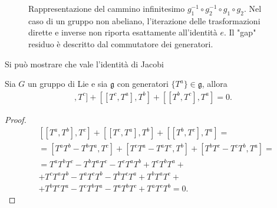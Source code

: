 \begin{figure}
    \centering
    \usetikzlibrary{positioning, calc}
    \caption{Rappresentazione del cammino infinitesimo $g_1^{-1} \circ g_2^{-1} \circ g_1 \circ g_2$. Nel caso di un gruppo non abeliano, l'iterazione delle trasformazioni dirette e inverse non riporta esattamente all'identità $e$. Il "gap" residuo è descritto dal commutatore dei generatori.}
\end{figure}

Si può mostrare che vale l'identità di Jacobi
\begin{prop}
    Sia $G$ un gruppo di Lie e sia $\mathfrak{g}$ con generatori $\{ T^a \} \in \mathfrak{g}$, allora
    \begin{align}
        [[T^a, T^b], T^c] + [[T^c, T^a], T^b] + [[T^b, T^c], T^a] = 0.
    \end{align}
\end{prop}
\begin{proof}
    \begin{align}
        &[[T^a, T^b], T^c] + [[T^c, T^a], T^b] + [[T^b, T^c], T^a] = \\
        &=[T^a T^b - T^b T^a, T^c] + [T^c T^a - T^a T^c, T^b] + [T^b T^c - T^c T^b, T^a] = \\
        &= T^a T^b T^c - T^b T^a T^c - T^c T^a T^b + T^c T^b T^a + \\
        &+ T^c T^a T^b - T^a T^c T^b - T^b T^c T^a + T^b T^a T^c + \\
        &+ T^b T^c T^a - T^c T^b T^a - T^a T^b T^c + T^a T^c T^b = 0.   
    \end{align}
\end{proof}

